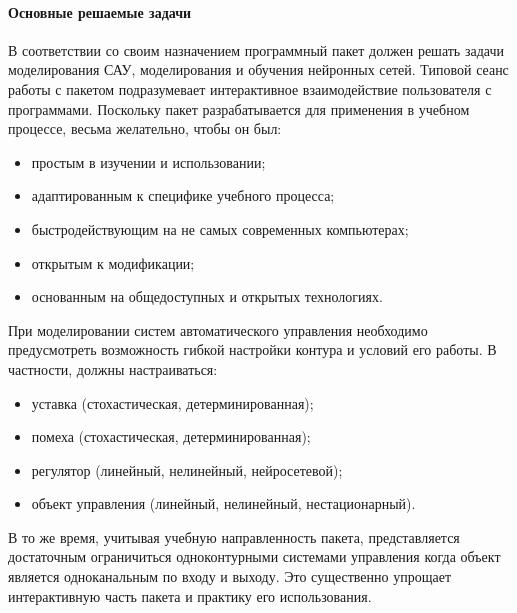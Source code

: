 
\paragraph{Основные решаемые задачи}\label{main_tasks}

В соответствии со своим назначением программный пакет должен решать
задачи моделирования САУ, моделирования и обучения нейронных сетей.
Типовой сеанс работы с пакетом подразумевает интерактивное
взаимодействие пользователя с программами.  Поскольку пакет
разрабатывается для применения в учебном процессе, весьма желательно,
чтобы он был:
\begin{itemize}
\item простым в изучении и использовании;
\item адаптированным к специфике учебного процесса;
\item быстродействующим на не самых современных компьютерах;
\item открытым к модификации;
\item основанным на общедоступных и открытых технологиях.
\end{itemize}

При моделировании систем автоматического управления необходимо
предусмотреть возможность гибкой настройки контура и условий его
работы.  В частности, должны настраиваться:
\begin{itemize}
\item уставка (стохастическая, детерминированная);
\item помеха (стохастическая, детерминированная);
\item регулятор (линейный, нелинейный, нейросетевой);
\item объект управления (линейный, нелинейный, нестационарный).
\end{itemize}


В то же время, учитывая учебную направленность пакета, представляется
достаточным ограничиться одноконтурными системами управления когда
объект является одноканальным по входу и выходу.  Это существенно
упрощает интерактивную часть пакета и практику его использования.

